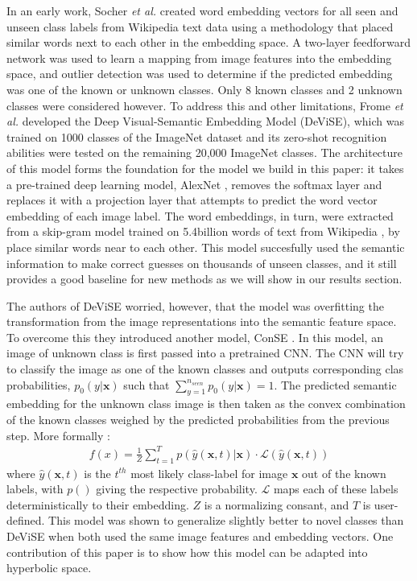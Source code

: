 \documentclass[12pt]{report}
\begin{document}
In an early work, Socher \textit{et al.} \cite{Socher} created word embedding vectors for all seen and unseen class labels from Wikipedia text data using a methodology \cite{Huang2012} that placed similar words next to each other in the embedding space. A two-layer feedforward network was used to learn a mapping from image features into the embedding space, and outlier detection was used to determine if the predicted embedding was one of the known or unknown classes. Only 8 known classes and 2 unknown classes were considered however. To address this and other limitations, Frome \textit{et al.} \cite{Frome2013} developed the Deep Visual-Semantic Embedding Model (DeViSE), which was trained on 1000 classes of the ImageNet dataset and its zero-shot recognition abilities were tested on the remaining 20,000 ImageNet classes. The architecture of this model forms the foundation for the model we build in this paper: it takes a pre-trained deep learning model, AlexNet \cite{Krizhevsky2012}, removes the softmax layer and replaces it with a projection layer that attempts to predict the word vector embedding of each image label. The word embeddings, in turn, were extracted from a skip-gram model trained on 5.4billion words of text from Wikipedia \cite{Mikolov2013}, \cite{Mikolov} by place similar words near to each other. This model succesfully used the semantic information to make correct guesses on thousands of unseen classes, and it still provides a good baseline for new methods as we will show in our results section. 

The authors of DeViSE worried, however, that the model was overfitting the transformation from the image representations into the semantic feature space. To overcome this they introduced another model, ConSE \cite{Norouzi2013}. In this model, an image of unknown class is first passed into a pretrained CNN. The CNN will try to classify the image as one of the known classes and outputs corresponding clas probabilities, $p_0 (y | \mathbf{x})$ such that $\sum_{y=1}^{n_{seen}} p_0 (y | \mathbf{x}) = 1$. The predicted semantic embedding for the unknown class image is then taken as the convex combination of the known classes weighed by the predicted probabilities from the previous step. More formally \cite{Norouzi2013}:
\begin{align}
  f(x) = \frac{1}{Z}\sum_{t=1}^T p(\hat{y}(\mathbf{x}, t)| \mathbf{x}) \cdot \mathcal{L}(\hat{y}(\mathbf{x}, t))
\end{align}
where $\hat{y}(\mathbf{x}, t)$ is the $t^{th}$ most likely class-label for image $\mathbf{x}$ out of the known labels, with $p()$ giving the respective probability. $\mathcal{L}$ maps each of these labels deterministically to their embedding. $Z$ is a normalizing consant, and $T$ is user-defined. This model was shown to generalize slightly better to novel classes than DeViSE when both used the same image features and embedding vectors. One contribution of this paper is to show how this model can be adapted into hyperbolic space.
\end{document}
